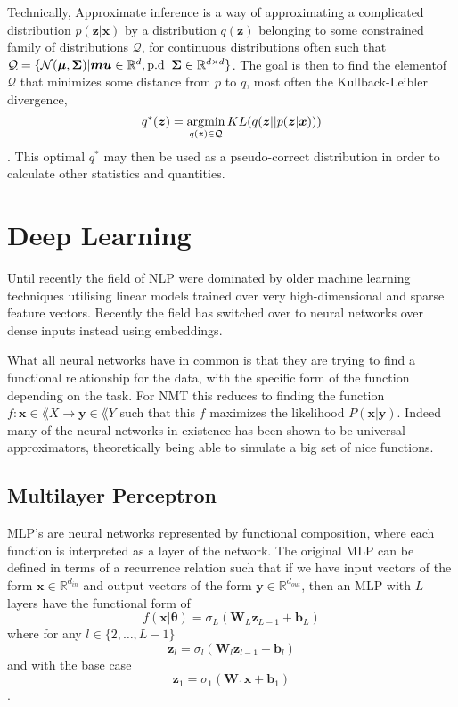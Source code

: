 Technically, Approximate inference is a way of approximating
a complicated distribution $p(\bm{z} | \bm{x})$ by a distribution $q(\bm{z})$ belonging
to some constrained family of distributions $\mathcal{Q}$, for continuous
distributions often such that $\mathcal{Q} = \{\mathcal{N}(\bm{\mu},
\bm{\Sigma}) | \bm{mu} \in \mathbb{R}^d, \text{p.d \:} \bm{\Sigma} \in
\mathbb{R}^{d \times d}\}$. The goal is then to find the elementof $\mathcal{Q}$
that minimizes some distance from $p$ to $q$, most often the Kullback-Leibler
divergence,
\begin{equation}
  \label{eq:AI_optimal_element}
  q^*(\bm{z}) = \operatorname*{\arg\!\min}_{q(\bm{z}) \in \mathcal{Q}} KL(q(\bm{z} || p(\bm{z} | \bm{x})))
\end{equation}.
This optimal $q^*$ may then be used as a pseudo-correct
distribution in order to calculate other statistics and quantities.

\section{Deep Learning}
Until recently the field of NLP were dominated by older machine learning
techniques utilising linear models trained over very high-dimensional and sparse
feature vectors. Recently the field has switched over to neural networks over
dense inputs instead using embeddings\cite[p.~1 - 2]{goldberg2015primer}.

What all neural networks have in common is that they are trying to find a
functional relationship for the data, with the specific form of the function
depending on the task. For NMT this reduces to finding the function $f : \bm{x}
\in \lang{X} \to \bm{y} \in \lang{Y}$ such that this $f$ maximizes the
likelihood $P(\bm{x} | \bm{y})$. Indeed many of the neural networks in existence
has been shown to be universal approximators, theoretically being able to
simulate a big set of nice functions\cite{Hornik:1989:MFN:70405.70408}.

\subsection{Multilayer Perceptron}
MLP's are neural networks represented by functional composition, where each
function is interpreted as a layer of the network. The original MLP can be defined in
terms of a recurrence relation such that if we have input vectors of the form $\bm{x} \in
\mathbb{R}^{d_{in}}$ and output vectors of the form $\bm{y} \in
\mathbb{R}^{d_{out}}$, then an MLP with $L$ layers have the functional form of
\begin{equation}
  f(\bm{x} | \bm{\theta}) = \sigma_L(\bm{W}_L \bm{z}_{L-1} + \bm{b}_{L})
\end{equation}
where for any $l \in \{2, \dots, L-1\}$
\begin{equation}
    \bm{z}_l = \sigma_l(\bm{W}_l \bm{z}_{l-1} + \bm{b}_l)
\end{equation}
and with the base case
\begin{equation}
  \bm{z}_1 = \sigma_1(\bm{W}_1 \bm{x} + \bm{b}_1)
\end{equation}.

